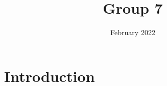 \documentclass{article}
\title{Group 7}
\date{February 2022}
\begin{document}
\maketitle

\section{Introduction}
\end{document}
